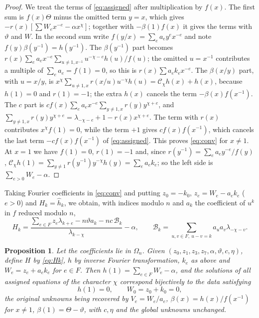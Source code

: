 \documentclass{amsart}
\newtheorem{proposition}[theorem]{Proposition}
\theoremstyle{definition}
\theoremstyle{remark}
\numberwithin{equation}{section}
\begin{document}
\begin{proof}
We treat the terms of \eqref{eq:assigned} after multiplication by $f(x)$. The first
sum is $f(x)\Theta$ minus the omitted term $y=x$, which gives
$-r(x)[\sum W_ex^{-e}-\alpha x^\chi]$; together with $-\beta(1)f(x)$ it gives the
terms with $\vartheta$ and $W$. In the second sum write
$f(y/x)=\sum_ea_ey^ex^{-e}$ and note $f(y)\beta(y^{-1})=h(y^{-1})$. The
$\beta(y^{-1})$ part becomes $r(x)\sum_ea_ex^{-e}\sum_{u\ne1,x^{-1}}u^{-\chi-e}h(u)/f(u)$;
the omitted $u=x^{-1}$ contributes a multiple of $\sum_ea_e=f(1)=0$, so this is
$r(x)\sum a_ek_ex^{-e}$. The $\beta(x/y)$ part, with $u=x/y$, is
$x^\chi\sum_{u\ne1,x}r(x/u)u^{-\chi}h(u)=\mathcal C_\chi h(x)+h(x)$, because
$h(1)=0$ and $r(1)=-1$; the extra $h(x)$ cancels the term $-\beta(x)f(x^{-1})$. The
$c$ part is $cf(x)\sum_ea_ex^{-e}\sum_{y\ne1,x}r(y)y^{\chi+e}$, and
$\sum_{y\ne1,x}r(y)y^{\chi+e}=\lambda_{-\chi-e}+1-r(x)x^{\chi+e}$. The term with
$r(x)$ contributes $x^\chi f(1)=0$, while the term $+1$ gives $cf(x)f(x^{-1})$, which
cancels the last term $-cf(x)f(x^{-1})$ of \eqref{eq:assigned}. This proves
\eqref{eq:conv} for $x\ne1$. At $x=1$ we have $f(1)=0$, $r(1)=-1$ and, since
$r(y^{-1})=\sum_ea_ey^{-e}/f(y)$,
$\mathcal C_\chi h(1)=\sum_{y\ne1}r(y^{-1})y^{-\chi}h(y)=\sum_ea_ek_e$; so the left
side is $\sum_{e>0}W_e-\alpha$.
\end{proof}

Taking Fourier coefficients in \eqref{eq:conv} and putting
$z_0=-k_0$, $z_e=W_e-a_ek_e$ ($e>0$) and $H_k=\hat h_k$, we obtain, with indices
modulo $n$ and $a_k$ the coefficient of $u^k$ in $f$ reduced modulo $n$,
\begin{equation}\label{eq:Hk}
  H_k=\frac{\sum_{e\in F}z_e\lambda_{k+e}-n\vartheta a_k-nc\,\mathcal B_k}{\lambda_{k-\chi}}
     -\alpha,\qquad
  \mathcal B_k=\sum_{u,v\in F,\ u-v=k}a_ua_v\lambda_{-\chi-v}.
\end{equation}

\begin{proposition}\label{prop:eight}
Let the coefficients lie in $\Omega_n$. Given
$(z_0,z_1,z_3,z_7,\alpha,\vartheta,c,\eta)$, define $H$ by \eqref{eq:Hk}, $h$ by inverse
Fourier transformation, $k_e$ as above and $W_e=z_e+a_ek_e$ for $e\in F$. Then
$h(1)=\sum_{e\in F}W_e-\alpha$, and the solutions of all assigned equations of the
character $\chi$ correspond bijectively to the data satisfying
\begin{equation}\label{eq:twoconstr}
  h(1)=0,\qquad W_0=z_0+k_0=0,
\end{equation}
the original unknowns being recovered by $V_e=W_e/a_e$, $\beta(x)=h(x)/f(x^{-1})$ for
$x\ne1$, $\beta(1)=\Theta-\vartheta$, with $c,\eta$ and the global unknowns unchanged.
\end{proposition}
\end{document}
